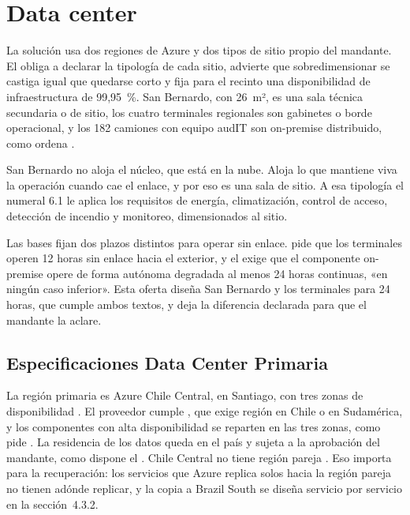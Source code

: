 \section{Data center}\label{sec:4-datacenter}

La solución usa dos regiones de Azure y dos tipos de sitio propio del mandante. El  obliga a declarar la tipología de cada sitio, advierte que sobredimensionar se castiga igual
que quedarse corto y fija para el recinto una disponibilidad de infraestructura de 99,95~\%. San Bernardo,
con 26~m², es una sala técnica secundaria o de sitio, los cuatro terminales regionales son gabinetes o
borde operacional, y los 182 camiones con equipo audIT son on-premise distribuido, como ordena
.

San Bernardo no aloja el núcleo, que está en la nube. Aloja lo que mantiene viva la operación cuando
cae el enlace, y por eso es una sala de sitio. A esa tipología el numeral 6.1 le aplica los requisitos
de energía, climatización, control de acceso, detección de incendio y monitoreo, dimensionados al sitio.

Las bases fijan dos plazos distintos para operar sin enlace.  pide que los
terminales operen 12 horas sin enlace hacia el exterior, y el  exige que el componente
on-premise opere de forma autónoma degradada al menos 24 horas continuas, «en ningún caso inferior». Esta
oferta diseña San Bernardo y los terminales para 24 horas, que cumple ambos textos, y deja la diferencia
declarada para que el mandante la aclare.

\subsection{Especificaciones Data Center Primaria}\label{sec:4-dc-primario}

La región primaria es Azure Chile Central, en Santiago, con tres zonas de disponibilidad
\parencite{ms_regions}. El proveedor cumple , que exige región en Chile o en
Sudamérica, y los componentes con alta disponibilidad se reparten en las tres zonas, como pide
. La residencia de los datos queda en el país y sujeta a la aprobación del mandante,
como dispone el . Chile Central no tiene región pareja \parencite{ms_regions}. Eso importa
para la recuperación: los servicios que Azure replica solos hacia la región pareja no tienen adónde
replicar, y la copia a Brazil South se diseña servicio por servicio en la sección~4.3.2.

